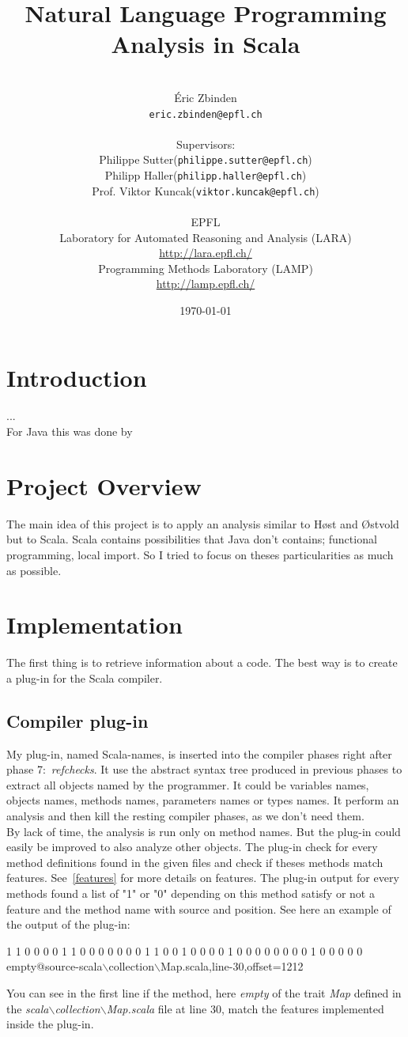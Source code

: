 \documentclass[12pt]{article}
\title{Natural Language Programming Analysis in Scala}
\author{\\ \'Eric Zbinden \\ \texttt{eric.zbinden@epfl.ch} \\ \\ Supervisors: \\Philippe Sutter(\texttt{philippe.sutter@epfl.ch})\\ Philipp Haller(\texttt{philipp.haller@epfl.ch})\\Prof. Viktor Kuncak(\texttt{viktor.kuncak@epfl.ch}) \\ \\ EPFL\\ Laboratory for Automated Reasoning and Analysis (LARA) \\ \url{http://lara.epfl.ch/}\\ Programming Methods Laboratory (LAMP) \\ \url{http://lamp.epfl.ch/} }
\date{\today}
\newcommand{\code}[1]{{\fontfamily{phv}\selectfont \small{\begin{tabbing} #1 \end{tabbing}}}}
\begin{document}
\maketitle
\newpage
\tableofcontents
\newpage

\section{Introduction}
...\\
For Java this was done by  

\section {Project Overview}
The main idea of this project is to apply an analysis similar to H{\o}st and {\O}stvold~\cite{DebugMN} but to Scala. Scala contains possibilities that Java don't contains; functional programming, local import. So I tried to focus on theses particularities as much as possible.

\section {Implementation}
The first thing is to retrieve information about a code. The best way is to create a plug-in for the Scala compiler. 

\subsection{Compiler plug-in}
My plug-in, named Scala-names, is inserted into the compiler phases right after phase 7:~\textit{refchecks}. It use the abstract syntax tree produced in previous phases to extract all objects named by the programmer. It could be variables names, objects names, methods names, parameters names or types names. It perform an analysis and then kill the resting compiler phases, as we don't need them.\\

By lack of time, the analysis is run only on method names. But the plug-in could easily be improved to also analyze other objects.
The plug-in check for every method definitions found in the given files and check if theses methods match features. See~\ref{features} for more details on features. The plug-in output for every methods found a list of "1" or "0" depending on this method satisfy or not a feature and the method name with source and position. See here an example of the output of the plug-in:
\code{1 1 0 0 0 0 1 1 0 0 0 0 0 0 0 1 1 0 0 1 0 0 0 0 1 0 0 0 0 0 0 0 0 1 0 0 0 0 0 \\empty@source-scala$\backslash$collection$\backslash$Map.scala,line-30,offset=1212}
You can see in the first line if the method, here \textit{empty} of the trait \textit{Map} defined in the \textit{scala$\backslash$collection$\backslash$Map.scala} file at line 30, match the features implemented inside the plug-in.
\end{document}
